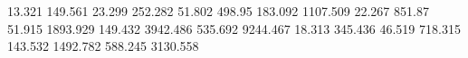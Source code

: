 13.321     149.561    %
23.299     252.282    %
51.802     498.95     %
183.092    1107.509   %
22.267     851.87     %
51.915     1893.929   %
149.432    3942.486   %
535.692    9244.467   %
18.313     345.436    %
46.519     718.315    %
143.532    1492.782   %
588.245    3130.558   %
